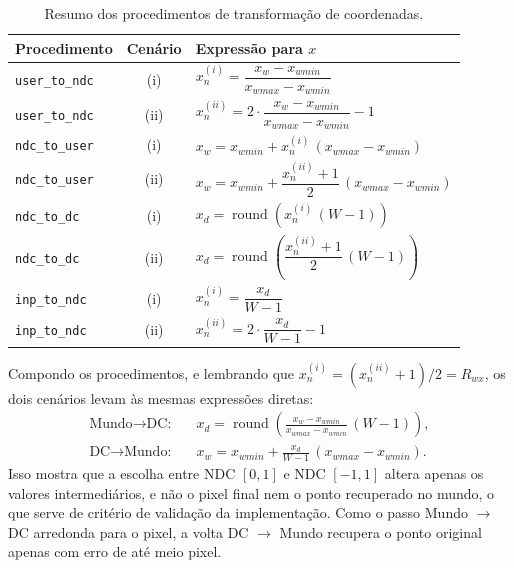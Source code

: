 \begin{table}[H]
    \centering
    \renewcommand{\arraystretch}{1.9}
    \small
    \begin{tabular}{l|c|l}
        \textbf{Procedimento} & \textbf{Cenário} & \textbf{Expressão para $x$} \\ \hline
        \texttt{user\_to\_ndc} & (i)  & $x_n^{(i)} = \dfrac{x_w - x_{wmin}}{x_{wmax} - x_{wmin}}$ \\
        \texttt{user\_to\_ndc} & (ii) & $x_n^{(ii)} = 2 \cdot \dfrac{x_w - x_{wmin}}{x_{wmax} - x_{wmin}} - 1$ \\
        \texttt{ndc\_to\_user} & (i)  & $x_w = x_{wmin} + x_n^{(i)} \, (x_{wmax} - x_{wmin})$ \\
        \texttt{ndc\_to\_user} & (ii) & $x_w = x_{wmin} + \dfrac{x_n^{(ii)} + 1}{2} \, (x_{wmax} - x_{wmin})$ \\
        \texttt{ndc\_to\_dc}   & (i)  & $x_d = \operatorname{round}\!\left( x_n^{(i)} \, (W-1) \right)$ \\
        \texttt{ndc\_to\_dc}   & (ii) & $x_d = \operatorname{round}\!\left( \dfrac{x_n^{(ii)} + 1}{2} \, (W-1) \right)$ \\
        \texttt{inp\_to\_ndc}  & (i)  & $x_n^{(i)} = \dfrac{x_d}{W-1}$ \\
        \texttt{inp\_to\_ndc}  & (ii) & $x_n^{(ii)} = 2 \cdot \dfrac{x_d}{W-1} - 1$
    \end{tabular}
    \caption{Resumo dos procedimentos de transformação de coordenadas.}
    \label{tab:sintese}
\end{table}

Compondo os procedimentos, e lembrando que $x_n^{(i)} = \left(x_n^{(ii)} + 1\right)/2 = R_{wx}$, os dois cenários levam às mesmas expressões diretas:
\begin{align*}
    \text{Mundo} \rightarrow \text{DC:} \quad & x_d = \operatorname{round}\!\left( \frac{x_w - x_{wmin}}{x_{wmax} - x_{wmin}} \, (W-1) \right), \\[1mm]
    \text{DC} \rightarrow \text{Mundo:} \quad & x_w = x_{wmin} + \frac{x_d}{W-1} \, (x_{wmax} - x_{wmin}).
\end{align*}
Isso mostra que a escolha entre NDC $[0,1]$ e NDC $[-1,1]$ altera apenas os valores intermediários, e não o pixel final nem o ponto recuperado no mundo, o que serve de critério de validação da implementação. Como o passo Mundo $\rightarrow$ DC arredonda para o pixel, a volta DC $\rightarrow$ Mundo recupera o ponto original apenas com erro de até meio pixel.

